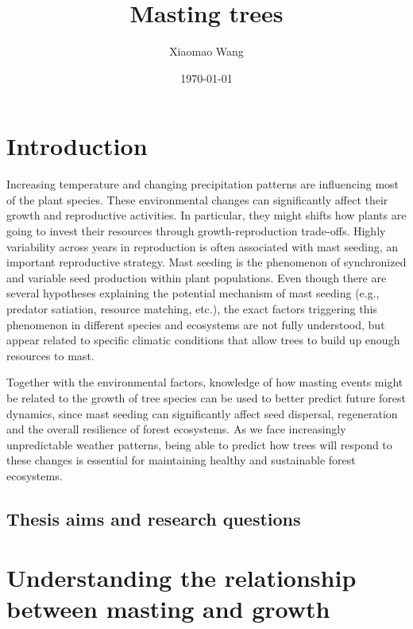 \documentclass[12pt,letter]{article}
\begin{document}

\renewcommand{\refname}{\CHead{}}

\title{Masting trees}
\author{Xiaomao Wang} 
\date{\today}
\maketitle

\setlength{\parindent}{0pt}
\setlength{\parskip}{3pt}

\section{Introduction}
Increasing temperature and changing precipitation patterns are influencing most of the plant species. These environmental changes can significantly affect their growth and reproductive activities. In particular, they might shifts how plants are going to invest their resources through growth-reproduction trade-offs. Highly variability across years in reproduction is often associated with mast seeding, an important reproductive strategy. Mast seeding is the phenomenon of synchronized and variable seed production within plant populations. Even though there are several hypotheses explaining the potential mechanism of mast seeding (e.g., predator satiation, resource matching, etc.), the exact factors triggering this phenomenon in different species and ecosystems are not fully understood, but appear related to specific climatic conditions that allow trees to build up enough resources to mast.

Together with the environmental factors, knowledge of how masting events might be related to the growth of tree species can be used to better predict future forest dynamics, since mast seeding can significantly affect seed dispersal, regeneration and the overall resilience of forest ecosystems. As we face increasingly unpredictable weather patterns, being able to predict how trees will respond to these changes is essential for maintaining healthy and sustainable forest ecosystems.

\subsection{Thesis aims and research questions}

\section{Understanding the relationship between masting and growth}
\end{document}
